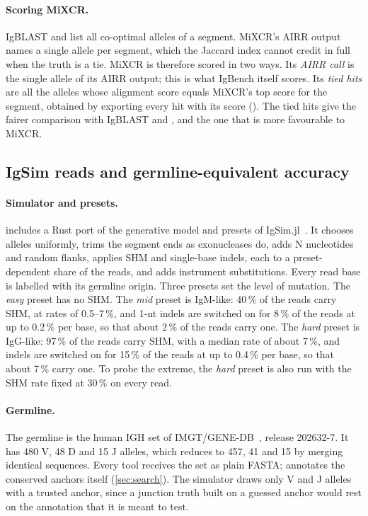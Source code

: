 \documentclass[11pt,a4paper]{article}
\begin{document}
\paragraph{Scoring MiXCR.} IgBLAST and \swig{} list all co-optimal alleles
of a segment. MiXCR's AIRR output names a single allele per segment, which
the Jaccard index cannot credit in full when the truth is a tie. MiXCR is
therefore scored in two ways. Its \emph{AIRR call} is the single allele of
its AIRR output; this is what IgBench itself scores. Its \emph{tied hits}
are all the alleles whose alignment score equals MiXCR's top score for the
segment, obtained by exporting every hit with its score
(). The tied hits give the fairer comparison with
IgBLAST and \swig, and the one that is more favourable to MiXCR.

\subsection{IgSim reads and germline-equivalent accuracy}
\label{sec:protocol-igsim}

\paragraph{Simulator and presets.} \swig{} includes a Rust port of the
generative model and presets of IgSim.jl~\cite{igsimjl}. It chooses alleles
uniformly, trims the segment ends as exonucleases do, adds N nucleotides and
random flanks, applies SHM and single-base indels, each to a
preset-dependent share of the reads, and adds instrument substitutions.
Every read base is labelled with its germline origin. Three presets set the
level of mutation. The \emph{easy} preset has no SHM. The \emph{mid} preset
is IgM-like: 40\,\% of the reads carry SHM, at rates of 0.5--7\,\%, and
1-nt indels are switched on for 8\,\% of the reads at up to 0.2\,\% per
base, so that about 2\,\% of the reads carry one. The \emph{hard} preset is
IgG-like: 97\,\% of the reads carry SHM, with a median rate of about 7\,\%,
and indels are switched on for 15\,\% of the reads at up to 0.4\,\% per
base, so that about 7\,\% carry one. To probe the extreme, the \emph{hard}
preset is also run with the SHM rate fixed at 30\,\% on every read.

\paragraph{Germline.} The germline is the human IGH set of
IMGT/GENE-DB~\cite{giudicelli2005genedb}, release 202632-7. It has 480 V, 48
D and 15 J alleles, which \swig{} reduces to 457, 41 and 15 by merging
identical sequences. Every tool receives the set as plain FASTA; \swig{}
annotates the conserved anchors itself (\cref{sec:search}). The simulator
draws only V and J alleles with a trusted anchor, since a junction truth
built on a guessed anchor would rest on the annotation that it is meant to
test.
\end{document}
